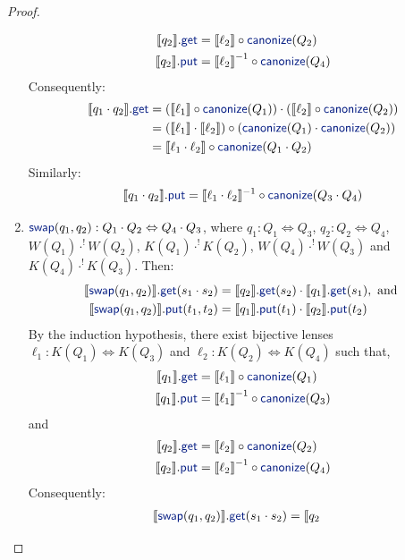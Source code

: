 \documentclass[acmsmall,review,anonymous]{acmart}
\newcommand{\kw}[1]{\textcolor{dkblue}{\ensuremath{\mathsf{#1}}}}
\newcommand{\canonize}{\ensuremath{\kw{canonize}}}
\newcommand{\get}{\ensuremath{\kw{get}}}
\newcommand{\lput}{\ensuremath{\kw{put}}}
\newcommand{\swap}{\ensuremath{\kw{swap}}}
\begin{document}
\begin{proof}
\begin{enumerate}
\begin{align*}
\llbracket q_2 \rrbracket.\get &= \llbracket \ell_2 \rrbracket \circ
\canonize(Q_2)\\
\llbracket q_2 \rrbracket.\lput &= {\llbracket \ell_2 \rrbracket}^{-1} \circ
\canonize(Q_4)
\end{align*}
Consequently:
\begin{align*}
\llbracket q_1 \cdot q_2 \rrbracket.\get &= (\llbracket \ell_1 \rrbracket \circ
\canonize(Q_1)) \cdot  (\llbracket \ell_2 \rrbracket \circ
\canonize(Q_2))\\
&= (\llbracket \ell_1 \rrbracket \cdot \llbracket \ell_2
\rrbracket) \circ (\canonize(Q_1) \cdot \canonize(Q_2))\\
&= \llbracket \ell_1 \cdot  \ell_2 \rrbracket \circ \canonize(Q_1 \cdot Q_2)
\end{align*}
Similarly:
$$
\llbracket q_1 \cdot q_2\rrbracket.\lput = \llbracket \ell_1 \cdot  \ell_2
\rrbracket^{-1} \circ \canonize(Q_3 \cdot Q_4) $$
\item
$\swap(q_1,q_2): Q_1 \cdot Q_2 \Leftrightarrow Q_4 \cdot Q_3$, where $q_1 : Q_1
\Leftrightarrow Q_3 $,  $q_2 : Q_2 \Leftrightarrow Q_4$, $W(Q_1)
\cdot^! W(Q_2)$, $K(Q_1) \cdot^! K(Q_2)$, $W(Q_4) \cdot^! W(Q_3)$ and $
K(Q_4) \cdot^! K(Q_3)$. Then:
\begin{align*}
\llbracket \swap(q_1, q_2) \rrbracket.\get(s_1 \cdot s_2) &= \llbracket q_2
\rrbracket.\get(s_2) \cdot \llbracket q_1 \rrbracket.\get(s_1), \text{ and }\\
\llbracket \swap(q_1, q_2) \rrbracket.\lput(t_1, t_2) &= \llbracket q_1
\rrbracket.\lput(t_1) \cdot \llbracket q_2 \rrbracket.\lput(t_2)
\end{align*}
By the induction hypothesis, there exist bijective lenses $\ell_1 : K(Q_1)
\Leftrightarrow K(Q_3)$ and $\ell_2 : K(Q_2) \Leftrightarrow K(Q_4)$ such that,
\begin{align*}
\llbracket q_1 \rrbracket.\get &= \llbracket \ell_1 \rrbracket \circ
\canonize(Q_1)\\
\llbracket q_1 \rrbracket.\lput &= {\llbracket \ell_1 \rrbracket}^{-1} \circ
\canonize(Q_3)
\end{align*}
and
\begin{align*}
\llbracket q_2 \rrbracket.\get &= \llbracket \ell_2 \rrbracket \circ
\canonize(Q_2)\\
\llbracket q_2 \rrbracket.\lput &= {\llbracket \ell_2 \rrbracket}^{-1} \circ
\canonize(Q_4)
\end{align*}
Consequently:
\begin{align*}
\llbracket \swap(q_1, q_2) \rrbracket.\get(s_1 \cdot s_2) &= \llbracket q_2

\end{align*}
\end{enumerate}
\end{proof}
\end{document}
